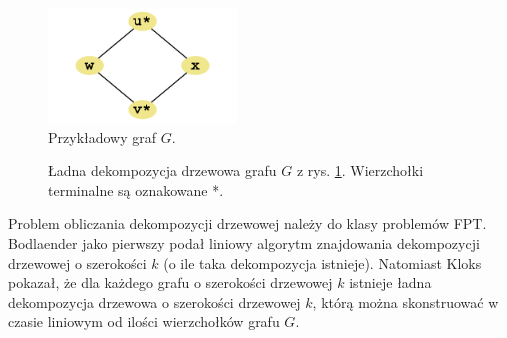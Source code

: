 \documentclass[12pt, oneside]{report}
\begin{document}
\begin{figure}
\centering
\includegraphics[width=5cm]{square_steiner_tree_standard_graph.png}
\caption{Przykładowy graf $G$.}
\label{kwadrat}
\end{figure}

\begin{figure}
\centering
{}
\caption{Ładna dekompozycja drzewowa grafu $G$ z rys. \ref{kwadrat}. Wierzchołki terminalne są oznakowane *.}
\label{dekompozycja_kwadratu}
\end{figure}

Problem obliczania dekompozycji drzewowej należy do klasy problemów FPT. Bodlaender \cite{bodlaender} jako pierwszy podał liniowy algorytm znajdowania dekompozycji drzewowej o szerokości $k$ (o ile taka dekompozycja istnieje). Natomiast Kloks \cite{kloks} pokazał, że dla każdego grafu o szerokości drzewowej $k$ istnieje ładna dekompozycja drzewowa o szerokości drzewowej $k$, którą można skonstruować w czasie liniowym od ilości wierzchołków grafu $G$.
\end{document}
